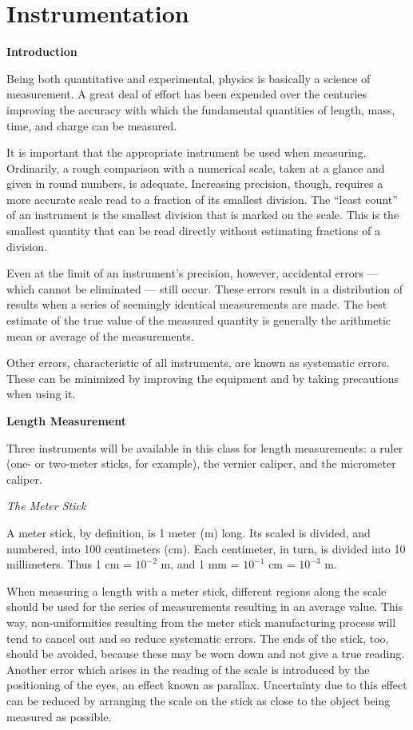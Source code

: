 
\section{Instrumentation}
\label{instrumentation}

\textbf{Introduction}

Being both quantitative and experimental, physics is basically a science of measurement. A great deal of effort has been expended over the centuries improving the accuracy with which the fundamental quantities of length, mass, time, and charge can be measured.

It is important that the appropriate instrument be used when measuring. Ordinarily, a rough comparison with a numerical scale, taken at a glance and given in round numbers, is adequate. Increasing precision, though, requires a more accurate scale read to a fraction of its smallest division. The ``least count'' of an instrument is the smallest division that is marked on the scale. This is the smallest quantity that can be read directly without estimating fractions of a division.

Even at the limit of an instrument's precision, however, accidental
errors --- which cannot be eliminated --- still occur. These errors
result in a distribution of results when a series of seemingly
identical measurements are made.  The best estimate of the
true value of the measured quantity is generally
the arithmetic mean or average of the measurements.

Other errors, characteristic of all instruments, are known as systematic errors. These can be minimized by improving the equipment and by taking precautions when using it.

\textbf{Length Measurement}

Three instruments will be available in this class for length measurements: \hspace{3pt} a ruler (one- or two-meter sticks, for example), the vernier caliper, and the micrometer caliper.

\textit{The Meter Stick}

A meter stick, by definition, is 1 meter (m) long. Its scaled is divided, and numbered, into 100 centimeters (cm). Each centimeter, in turn, is divided into 10 millimeters. Thus 1 cm = $10^{-2}$ m, and 1 mm = $10^{-1}$ cm = $10^{-3}$ m.

When measuring a length with a meter stick, different regions along the scale should be used for the series of measurements resulting in an average value. This way, non-uniformities resulting from the meter stick manufacturing process will tend to cancel out and so reduce systematic errors. The ends of the stick, too, should be avoided, because these may be worn down and not give a true reading. Another error which arises in the reading of the scale is introduced by the positioning of the eyes, an effect known as parallax. Uncertainty due to this effect can be reduced by arranging the scale on the stick as close to the object being measured as possible.


